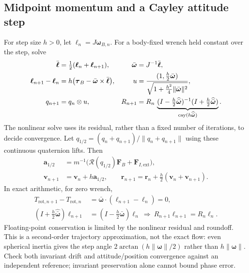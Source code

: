 \subsection{Midpoint momentum and a Cayley attitude step}
For step size $h>0$, let $\boldsymbol\ell_n=J\boldsymbol\omega_{B,n}$.
For a body-fixed wrench held constant over the step, solve
\begin{align}
 \bar{\boldsymbol\ell}&=\tfrac12(\boldsymbol\ell_n+
                                              \boldsymbol\ell_{n+1}),
 &\bar{\boldsymbol\omega}&=J^{-1}\bar{\boldsymbol\ell},\notag\\
 \boldsymbol\ell_{n+1}-\boldsymbol\ell_n
 &=h\bigl(\boldsymbol\tau_B-
               \bar{\boldsymbol\omega}\times\bar{\boldsymbol\ell}\bigr),
 &u&=\frac{(1,\tfrac h2\bar{\boldsymbol\omega})}
             {\sqrt{1+\tfrac{h^2}4\lVert\bar{\boldsymbol\omega}\rVert^2}},
 \notag\\
 q_{n+1}&=q_n\otimes u,
 &R_{n+1}&=R_n\,
 \underbrace{(I-\tfrac h2\widehat{\bar{\boldsymbol\omega}})^{-1}
             (I+\tfrac h2\widehat{\bar{\boldsymbol\omega}})}_
             {\operatorname{cay}(h\widehat{\bar{\boldsymbol\omega}})}.
 \label{gnc:midpoint-cayley}
\end{align}
The nonlinear solve uses its residual, rather than a fixed number of
iterations, to decide convergence. Let
$q_{1/2}=(q_n+q_{n+1})/\lVert q_n+q_{n+1}\rVert$ using these continuous
quaternion lifts. Then
\begin{align*}
 \mathbf a_{1/2}
 &=m^{-1}\bigl(\mathcal R(q_{1/2})\mathbf F_B+
                                      \mathbf F_{I,\mathrm{ext}}\bigr),\\
 \mathbf v_{n+1}&=\mathbf v_n+h\mathbf a_{1/2},\qquad
 \mathbf r_{n+1}=\mathbf r_n+\tfrac h2(\mathbf v_n+\mathbf v_{n+1}).
\end{align*}
In exact arithmetic, for zero wrench,
\begin{align*}
 T_{\mathrm{rot},n+1}-T_{\mathrm{rot},n}
 &=\bar{\boldsymbol\omega}\cdot
                 (\boldsymbol\ell_{n+1}-\boldsymbol\ell_n)=0,\\
 (I+\tfrac h2\widehat{\bar{\boldsymbol\omega}})
       \boldsymbol\ell_{n+1}
 &=(I-\tfrac h2\widehat{\bar{\boldsymbol\omega}})
       \boldsymbol\ell_n
 \ \Longrightarrow\ R_{n+1}\boldsymbol\ell_{n+1}
                         =R_n\boldsymbol\ell_n.
\end{align*}
Floating-point conservation is limited by the nonlinear residual and
roundoff. This is a second-order trajectory approximation, not the exact
flow: even spherical inertia gives the step angle
$2\arctan(h\lVert\boldsymbol\omega\rVert/2)$ rather than
$h\lVert\boldsymbol\omega\rVert$.
Check both invariant drift and attitude/position convergence against an
independent reference; invariant preservation alone cannot bound phase error.

